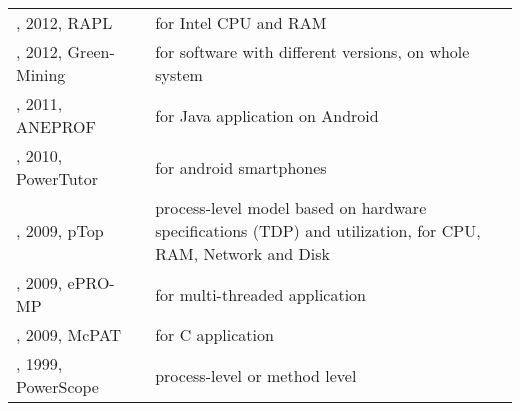 \begin{tabular}{|>{\raggedright\arraybackslash}p{5cm}|p{1.6cm}|p{8.55cm}|}
\cite{david2010, rotem2012, hackenberg2015}, 2012, RAPL & \cite{fahad2019} & for Intel CPU and RAM \\
\cite{hindle2012}, 2012, Green-Mining & \cite{rieger2017} & for software with different versions, on whole system \\
\cite{chung2011}, 2011, ANEPROF & \cite{ergasheva2020} & for Java application on Android \\
\cite{zhang2010}, 2010, PowerTutor & \cite{rieger2017} & for android smartphones \\
\cite{do2009}, 2009, pTop & \cite{noureddine2013} & process-level model based on hardware specifications (TDP) and utilization, for CPU, RAM, Network and Disk \\
\cite{wonil2009}, 2009, ePRO-MP & \cite{ergasheva2020} & for multi-threaded application \\
\cite{li2009}, 2009, McPAT & \cite{garcia-martin2019a} & for C application \\
\cite{flinn1999}, 1999, PowerScope & \cite{noureddine2013, pijnacker2023} & process-level or method level \\
\bottomrule
\end{tabular}
